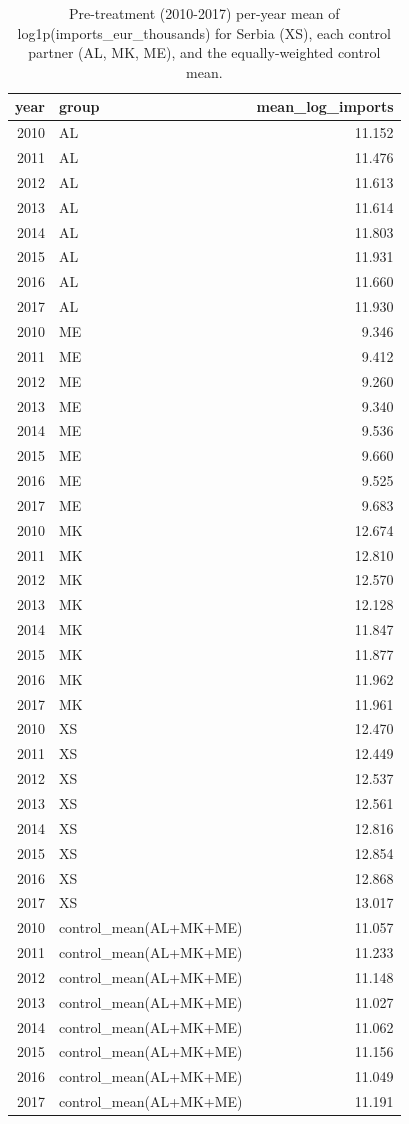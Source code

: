 \begin{table}
\caption{Pre-treatment (2010-2017) per-year mean of log1p(imports\_eur\_thousands) for Serbia (XS), each control partner (AL, MK, ME), and the equally-weighted control mean.}
\label{tbl:ch5-parallel-trends}
\begin{tabular}{rlr}
\toprule
year & group & mean\_log\_imports \\
\midrule
2010 & AL & 11.152 \\
2011 & AL & 11.476 \\
2012 & AL & 11.613 \\
2013 & AL & 11.614 \\
2014 & AL & 11.803 \\
2015 & AL & 11.931 \\
2016 & AL & 11.660 \\
2017 & AL & 11.930 \\
2010 & ME & 9.346 \\
2011 & ME & 9.412 \\
2012 & ME & 9.260 \\
2013 & ME & 9.340 \\
2014 & ME & 9.536 \\
2015 & ME & 9.660 \\
2016 & ME & 9.525 \\
2017 & ME & 9.683 \\
2010 & MK & 12.674 \\
2011 & MK & 12.810 \\
2012 & MK & 12.570 \\
2013 & MK & 12.128 \\
2014 & MK & 11.847 \\
2015 & MK & 11.877 \\
2016 & MK & 11.962 \\
2017 & MK & 11.961 \\
2010 & XS & 12.470 \\
2011 & XS & 12.449 \\
2012 & XS & 12.537 \\
2013 & XS & 12.561 \\
2014 & XS & 12.816 \\
2015 & XS & 12.854 \\
2016 & XS & 12.868 \\
2017 & XS & 13.017 \\
2010 & control\_mean(AL+MK+ME) & 11.057 \\
2011 & control\_mean(AL+MK+ME) & 11.233 \\
2012 & control\_mean(AL+MK+ME) & 11.148 \\
2013 & control\_mean(AL+MK+ME) & 11.027 \\
2014 & control\_mean(AL+MK+ME) & 11.062 \\
2015 & control\_mean(AL+MK+ME) & 11.156 \\
2016 & control\_mean(AL+MK+ME) & 11.049 \\
2017 & control\_mean(AL+MK+ME) & 11.191 \\
\bottomrule
\end{tabular}
\end{table}
